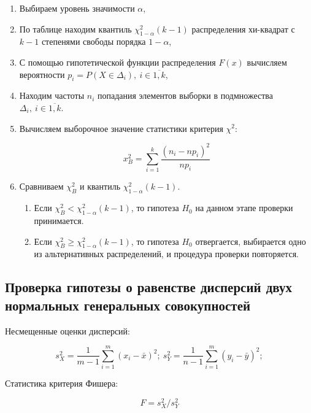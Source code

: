 \documentclass[12pt,a4paper]{article}
\begin{document}
	\begin{enumerate}
		\item Выбираем уровень значимости \( \alpha \),
		\item По таблице находим квантиль \( \chi_{1-\alpha}^2 (k - 1) \)
			распределения хи-квадрат с \( k - 1 \) степенями свободы порядка
			\( 1 - \alpha \),
		\item С помощью гипотетической функции распределения \( F(x) \)
			вычисляем вероятности
			\( p_i = P(X \in \Delta_i), \ i \in \overline{1,k} \),
		\item Находим частоты \( n_i \) попадания элементов выборки в
			подмножества \( \Delta_i, \ i \in \overline{1,k} \).
		\item Вычисляем выборочное значение статистики критерия \( \chi^2 \):

		\[ x_B^2 = \sum_{i=1}^k \frac{(n_i - np_i)^2}{np_i} \]

		\item Сравниваем \( \chi_B^2 \) и квантиль
			\( \chi_{1 - \alpha}^2 (k - 1) \).

		\begin{enumerate}
			\item Если \( \chi_B^2 < \chi_{1 - \alpha}^2 (k - 1) \), то гипотеза
				\( H_0 \) на данном этапе проверки принимается.
			\item Если \( \chi_B^2 \geqslant \chi_{1 - \alpha}^2 (k - 1) \), то
				гипотеза \( H_0 \) отвергается, выбирается одно из
				альтернативных распределений, и процедура проверки
				повторяется.
		\end{enumerate}
	\end{enumerate}

	\subsection{Проверка гипотезы о равенстве дисперсий двух нормальных
		генеральных совокупностей}

	Несмещенные оценки дисперсий:

	\begin{equation} \label{eq:unbiased_estimations_of_dispersion}
		s_X^2 = \frac{1}{m - 1} \sum_{i=1}^m (x_i - \bar x)^2; \
		s_Y^2 = \frac{1}{n - 1} \sum_{i=1}^m (y_i - \bar y)^2;
	\end{equation}

	Статистика критерия Фишера:

	\begin{equation} \label{eq:fisher}
		F = s_X^2 / s_Y^2
	\end{equation}
\end{document}
